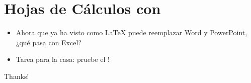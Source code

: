 \documentclass{beamer}
\begin{document}
\section{Hojas de Cálculos con  \protect{}}

\begin{frame}[fragile]{\insertsection}
  \begin{itemize}
  \item Ahora que ya ha  visto como \LaTeX{} puede reemplazar  Word y
    PowerPoint, ¿qué pasa con Excel?
  \item Tarea para la casa: pruebe el
    !
  \end{itemize}
\end{frame}

\begin{frame}
  \begin{center}
    Thanks!
  \end{center}
\end{frame}
\end{document}
